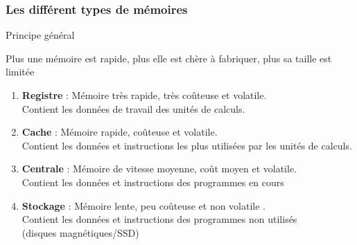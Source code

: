 \documentclass[8pt]{beamer}
\begin{document}
\begin{frame}
    \frametitle{Les différent types de mémoires}
    \begin{block}{Principe général}

        Plus une m\'emoire est rapide, plus elle est ch\`ere \`a
        fabriquer, plus sa taille est limit\'ee
    \end{block}
    \begin{enumerate}
        \item \textbf{Registre} : Mémoire très rapide, très coûteuse et
              volatile. \\
              Contient les données de travail des unités de calculs.
        \item \textbf{Cache} : Mémoire rapide, coûteuse et volatile. \\
              Contient les données et instructions les plus utilisées par les
              unités de calculs.
        \item \textbf{Centrale} : Mémoire de vitesse moyenne, coût moyen et
              volatile. \\
              Contient les données et instructions des programmes en cours
        \item \textbf{Stockage} : Mémoire lente, peu coûteuse et non volatile
              . \\
              Contient les données et instructions des programmes non utilisés
              \\
              (disques magnétiques/SSD)
    \end{enumerate}

\end{frame}
\end{document}
